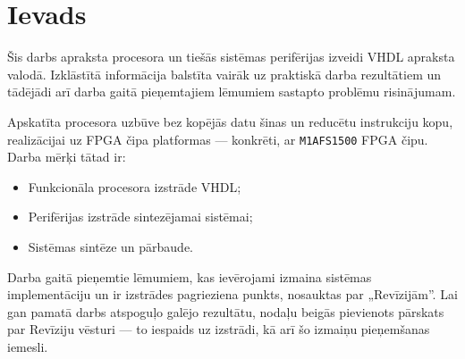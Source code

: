 \section*{Ievads} 
	Šis darbs apraksta procesora un tiešās sistēmas perifērijas izveidi
	VHDL apraksta valodā. Izklāstītā informācija balstīta vairāk uz
	praktiskā darba rezultātiem un tādējādi arī darba gaitā pieņemtajiem
	lēmumiem sastapto problēmu risinājumam.
	
	Apskatīta procesora uzbūve bez kopējās datu šinas un reducētu instruk\-ciju
	kopu, realizācijai uz FPGA čipa platformas — konkrēti,
	 ar \texttt{M1AFS1500}
	FPGA čipu. Darba mērķi tātad ir:
	\begin{itemize}
		\item Funkcionāla procesora izstrāde VHDL;
		\item Perifērijas izstrāde sintezējamai sistēmai;
		\item Sistēmas sintēze un pārbaude.
	\end{itemize}
	
	Darba gaitā pieņemtie lēmumiem, kas ievērojami izmaina sistēmas
	imple\-men\-tā\-ciju un ir izstrādes pagrieziena punkts, nosauktas par
	„Revīzijām”.
	Lai gan pamatā darbs atspoguļo galējo rezultātu, nodaļu
	beigās pievienots pārskats par Revīziju vēsturi — to iespaids uz
	izstrādi, kā arī šo izmaiņu pieņemšanas iemesli.
